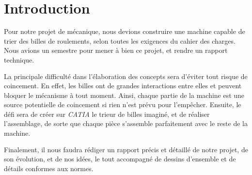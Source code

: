 \chapter{Introduction}
Pour notre projet de mécanique, nous devions construire une machine capable de trier des billes de roulements, selon toutes les exigences du cahier des charges. Nous avions un semestre pour mener à bien ce projet, et rendre un rapport technique. 

La principale difficulté dans l'élaboration des concepts sera d'éviter tout risque de coincement. En effet, les billes ont de grandes interactions entre elles et peuvent bloquer le mécanisme à tout moment. Ainsi, chaque partie de la machine est une source potentielle de coincement si rien n'est prévu pour l'empêcher. 
Ensuite, le défi sera de créer sur \emph{CATIA} le trieur de billes imaginé, et de réaliser l'assemblage, de sorte que chaque pièce s'assemble parfaitement avec le reste de la machine. 

Finalement, il nous faudra rédiger un rapport précis et détaillé de notre projet, de son évolution, et de nos idées, le tout accompagné de dessins d'ensemble et de détails conformes aux normes.